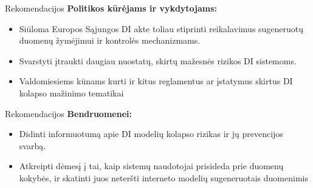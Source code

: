 \documentclass{beamer}
\begin{document}
\begin{frame}{Rekomendacijos}
    \textbf{Politikos kūrėjams ir vykdytojams:}
    \begin{itemize}
        \item Siūloma Europos Sąjungos DI akte toliau stiprinti reikalavimus sugeneruotų duomenų žymėjimui ir kontrolės mechanizmams.
        \item Svarstyti įtraukti daugiau nuostatų, skirtų mažesnės rizikos DI sistemoms.
        \item Valdomiesiems kūnams kurti ir kitus reglamentus ar įstatymus skirtus DI kolapso mažinimo tematikai
    \end{itemize}
\end{frame}

\begin{frame}{Rekomendacijos}
     \textbf{Bendruomenei:} 
        \begin{itemize}
            \item Didinti informuotumą apie DI modelių kolapso rizikas ir jų prevencijos svarbą.
            \item Atkreipti dėmesį į tai, kaip sistemų naudotojai prisideda prie duomenų kokybės, ir skatinti juos neteršti interneto modelių sugeneruotais duomenimis
        \end{itemize}
\end{frame}

\end{document}
